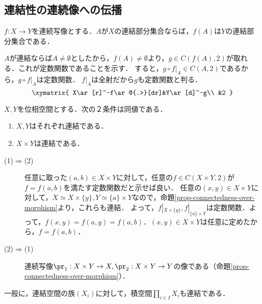 \documentclass[uplatex,dvipdfmx]{jsreport}
\begin{document}
\subsection{連結性の連続像への伝播}

\begin{proposition}[連続写像は連結性を保存する]\label{prop-connectedness-over-morphism}
    $f:X\to Y$を連続写像とする．$A$が$X$の連結部分集合ならば，$f(A)$は$Y$の連結部分集合である．
\end{proposition}
\begin{Proof}
    $A$が連結ならば$A\ne\emptyset$としたから，$f(A)\ne\emptyset$より，$g\in C(f(A),2)$が取れる．これが定数関数であることを示す．
    すると，$g\circ f|_A\in C(A,2)$であるから，$g\circ f|_A$は定数関数．
    $f|_A$は全射だから$g$も定数関数と判る．
    \[\xymatrix{
        X\ar[r]^-f\ar@{.>}[dr]&Y\ar[d]^-g\\
        &2
    }\]
\end{Proof}

\begin{corollary}[積への伝播]
    $X,Y$を位相空間とする．次の２条件は同値である．
    \begin{enumerate}
        \item $X,Y$はそれぞれ連結である．
        \item $X\times Y$は連結である．
    \end{enumerate}
\end{corollary}
\begin{Proof}\mbox{}
    \begin{description}
        \item[(1)$\Rightarrow$(2)] 
        任意に取った$(a,b)\in X\times Y$に対して，任意の$f\in C(X\times Y,2)$が$f=f(a,b)$を満たす定数関数だと示せば良い．
        任意の$(x,y)\in X\times Y$に対して，$X\simeq X\times\{y\},Y\simeq\{a\}\times Y$なので，命題\ref{prop-connectedness-over-morphism}より，これらも連結．
        よって，$f|_{X\times\{y\}},f|_{\{a\}\times Y}$は定数関数．よって，$f(x,y)=f(a,y)=f(a,b)$．$(x,y)\in X\times Y$は任意に定めたから，$f=f(a,b)$．
        \item[(2)$\Rightarrow$(1)]
        連続写像$\pr_1:X\times Y\to X,\pr_2:X\times Y\to Y$の像である（命題\ref{prop-connectedness-over-morphism}）．
    \end{description}
\end{Proof}

\begin{proposition}[AC]
    一般に，連結空間の族$(X_i)$に対して，積空間$\prod_{i\in I}X_i$も連結である．
\end{proposition}
\end{document}
